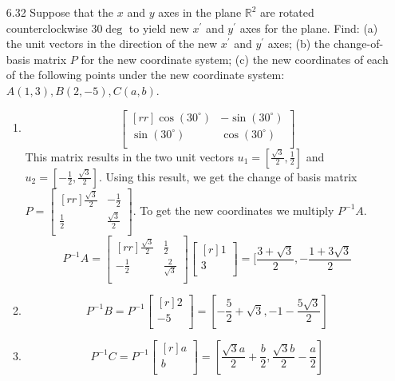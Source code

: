 \documentclass[12pt]{article}
\theoremstyle{definition}
\theoremstyle{plain}
\begin{document}
\begin{enumerate}
\item[6.32] Suppose that the $x$ and $y$ axes in the plane $\mathbb{R}^2$ are rotated counterclockwise $30\deg$ to yield new $x^\prime$ and $y^\prime$ axes for the plane. Find: (a) the unit vectors in the direction of the new $x^\prime$ and $y^\prime$ axes; (b) the change-of-basis matrix $P$ for the new coordinate system; (c) the new coordinates of each of the following points under the new coordinate system: $A(1,3), B(2,-5), C(a,b)$.
	\begin{enumerate}
	\item 
	\[ \begin{bmatrix}[rr]\cos(30^{\circ} )&-\sin(30^{\circ})\\\sin(30^{\circ})&\cos(30^{\circ})\\\end{bmatrix} \]
	This matrix results in the two unit vectors $u_1=[\frac{\sqrt{3}}{2},\frac{1}{2}]$ and $u_2=[-\frac{1}{2},\frac{\sqrt{3}}{2}]$. Using this result, we get the change of basis matrix $P=\begin{bmatrix}[rr]\frac{\sqrt{3}}{2}&-\frac{1}{2}\\\frac{1}{2}&\frac{\sqrt{3}}{2}\\\end{bmatrix}$. To get the new coordinates we multiply $P^{-1}A$.
	\[ P^{-1}A = \begin{bmatrix}[rr]\frac{\sqrt{3}}{2}&\frac{1}{2}\\-\frac{1}{2}&\frac{2}{\sqrt{3}}\\\end{bmatrix}\begin{bmatrix}[r]1\\3\\\end{bmatrix} = [\frac{3+\sqrt{3}}{2}, -\frac{1+3\sqrt{3}}{2} \]
	\item 
	\[ P^{-1}B = P^{-1}\begin{bmatrix}[r]2\\-5\\\end{bmatrix} = [-\frac{5}{2}+\sqrt{3}, -1-\frac{5\sqrt{3}}{2}] \]
	\item
	\[ P^{-1}C = P^{-1}\begin{bmatrix}[r]a\\b\\\end{bmatrix} = [\frac{\sqrt{3}a}{2}+\frac{b}{2}, \frac{\sqrt{3}b}{2}-\frac{a}{2}] \]
	\end{enumerate}
	

\end{enumerate}
\end{document}
